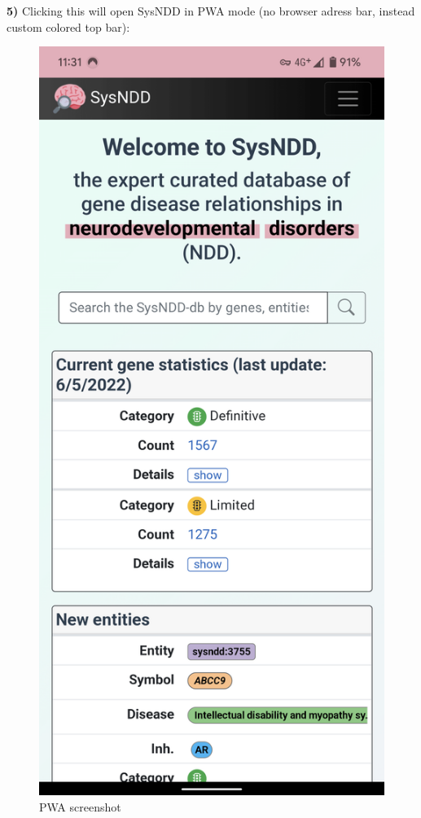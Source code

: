\documentclass[
]{article}
\begin{document}
\textbf{5)} Clicking this will open SysNDD in PWA mode (no browser adress bar, instead custom colored top bar):

\begin{figure}
\centering
\includegraphics{./static/img/02_28-PWA-install-e.png}
\caption{PWA screenshot}
\end{figure}
\end{document}
